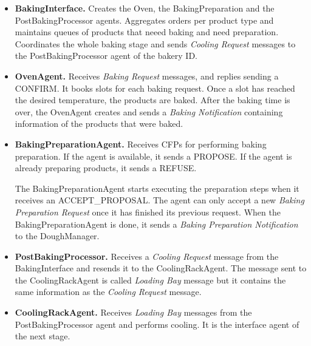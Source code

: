 \documentclass[paper=a4, fontsize=11pt]{scrartcl}
\begin{document}
\begin{itemize}
		\item \textbf{BakingInterface.} Creates the Oven, the BakingPreparation and the PostBakingProcessor agents. Aggregates orders per product type and maintains queues of products that neeed baking and need preparation. Coordinates the whole baking stage and sends \textit{Cooling Request} messages to the PostBakingProcessor agent of the bakery ID. \\

		\item \textbf{OvenAgent.} Receives \textit{Baking Request} messages, and replies sending a CONFIRM. It books slots for each baking request. Once a slot has reached the desired temperature, the products are baked. After the baking time is over, the OvenAgent creates and sends a \textit{Baking Notification} containing information of the products that were baked. \\

		\item \textbf{BakingPreparationAgent.} Receives CFPs for performing baking preparation. If the agent is available, it sends a PROPOSE. If the agent is already preparing products, it sends a REFUSE.

		The BakingPreparationAgent starts executing the preparation steps when it receives an ACCEPT\_PROPOSAL. The agent can only accept a new \textit{Baking Preparation Request} once it has finished its previous request. When the BakingPreparationAgent is done, it sends a \textit{Baking Preparation Notification} to the DoughManager. \\

		\item \textbf{PostBakingProcessor.} Receives a \textit{Cooling Request} message from the BakingInterface and resends it to the CoolingRackAgent. The message sent to the CoolingRackAgent is called \textit{Loading Bay} message but it contains the same information as the \textit{Cooling Request} message. \\

		\item \textbf{CoolingRackAgent.} Receives \textit{Loading Bay} messages from the PostBakingProcessor agent and performs cooling. It is the interface agent of the next stage.

	\end{itemize}
	\newpage
\end{document}
